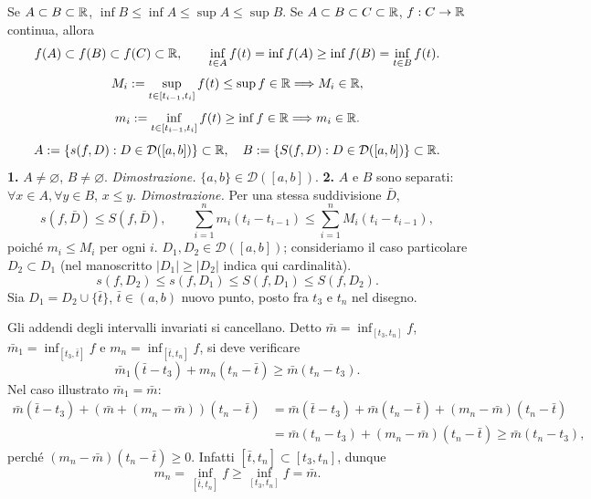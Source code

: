 Se $A\subset B\subset\mathbb R$, $\inf B\le\inf A\le\sup A\le\sup B$.
Se $A\subset B\subset C\subset\mathbb R$, $f:C\to\mathbb R$ continua, allora
\[f(A)\subset f(B)\subset f(C)\subset\mathbb R,\qquad
\inf_{t\in A}f(t)=\inf f(A)\ge\inf f(B)=\inf_{t\in B}f(t).\]
\[M_i:=\sup_{t\in[t_{i-1},t_i]}f(t)\le\sup f\in\mathbb R\Longrightarrow M_i\in\mathbb R,\]
\[m_i:=\inf_{t\in[t_{i-1},t_i]}f(t)\ge\inf f\in\mathbb R\Longrightarrow m_i\in\mathbb R.\]
\[A:=\{s(f,D):D\in\mathcal D([a,b])\}\subset\mathbb R,\quad
B:=\{S(f,D):D\in\mathcal D([a,b])\}\subset\mathbb R.\]
\textbf{1.} $A\ne\varnothing$, $B\ne\varnothing$.
\textit{Dimostrazione.} $\{a,b\}\in\mathcal D([a,b])$.
\textbf{2.} $A$ e $B$ sono separati: $\forall x\in A,\forall y\in B$, $x\le y$.
\textit{Dimostrazione.} Per una stessa suddivisione $\bar D$,
\[s(f,\bar D)\le S(f,\bar D),\qquad
\sum_{i=1}^n m_i(t_i-t_{i-1})\le\sum_{i=1}^n M_i(t_i-t_{i-1}),\]
poiché $m_i\le M_i$ per ogni $i$.
$D_1,D_2\in\mathcal D([a,b])$; consideriamo il caso particolare $D_2\subset D_1$ (nel manoscritto $|D_1|\ge|D_2|$ indica qui cardinalità).
\[s(f,D_2)\le s(f,D_1)\le S(f,D_1)\le S(f,D_2).\]
Sia $D_1=D_2\cup\{\bar t\}$, $\bar t\in(a,b)$ nuovo punto, posto fra $t_3$ e $t_n$ nel disegno.
\begin{center}\end{center}
Gli addendi degli intervalli invariati si cancellano. Detto $\bar m=\inf_{[t_3,t_n]}f$, $\bar m_1=\inf_{[t_3,\bar t]}f$ e $m_n=\inf_{[\bar t,t_n]}f$, si deve verificare
\[\bar m_1(\bar t-t_3)+m_n(t_n-\bar t)\ge\bar m(t_n-t_3).\]
Nel caso illustrato $\bar m_1=\bar m$:
\begin{align*}
\bar m(\bar t-t_3)+(\bar m+(m_n-\bar m))(t_n-\bar t)
&=\bar m(\bar t-t_3)+\bar m(t_n-\bar t)+(m_n-\bar m)(t_n-\bar t)\\
&=\bar m(t_n-t_3)+(m_n-\bar m)(t_n-\bar t)\ge\bar m(t_n-t_3),
\end{align*}
perché $(m_n-\bar m)(t_n-\bar t)\ge0$.
Infatti $[\bar t,t_n]\subset[t_3,t_n]$, dunque
\[m_n=\inf_{[\bar t,t_n]}f\ge\inf_{[t_3,t_n]}f=\bar m.\]
